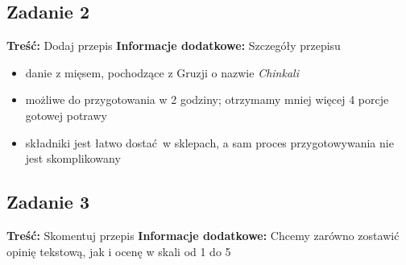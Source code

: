 \documentclass{article}
\begin{document}
\subsection{Zadanie 2}
\textbf{Treść:} Dodaj przepis\newline
\textbf{Informacje dodatkowe:} Szczegóły przepisu
\begin{itemize}
  \item danie z mięsem, pochodzące z Gruzji o nazwie \textit{Chinkali}
  \item możliwe do przygotowania w 2 godziny; otrzymamy mniej więcej 4 porcje gotowej potrawy
  \item składniki jest łatwo dostać w sklepach, a sam proces przygotowywania nie jest skomplikowany
\end{itemize}

\subsection{Zadanie 3}
\textbf{Treść:} Skomentuj przepis\newline
\textbf{Informacje dodatkowe:} Chcemy zarówno zostawić opinię tekstową, jak i ocenę w skali od 1 do 5
\end{document}

